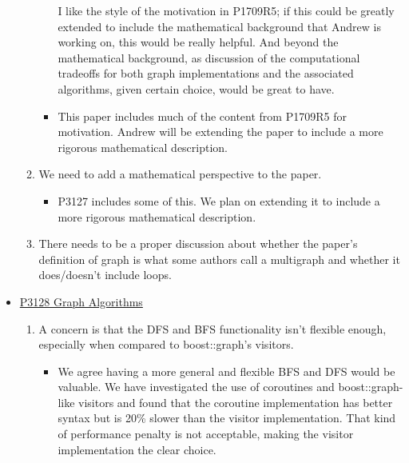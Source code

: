 \begin{itemize}
\begin{enumerate}
\begin{itemize}
                                    I like the style of the motivation in P1709R5; if this could be greatly extended to include the mathematical background that Andrew is 
                                    working on, this would be really helpful. And beyond the mathematical background, as discussion of the computational tradeoffs for 
                                    both graph implementations and the associated algorithms, given certain choice, would be great to have.
                              \item This paper includes much of the content from P1709R5 for motivation. Andrew will be extending the paper to include a more rigorous 
                                    mathematical description.
                        \end{itemize}
                  \item We need to add a mathematical perspective to the paper.
                        \begin{itemize}
                              \item P3127 includes some of this. We plan on extending it to include a more rigorous mathematical description.
                        \end{itemize}
                  \item There needs to be a proper discussion about whether the paper's definition of graph is what some authors call a multigraph 
                        and whether it does/doesn't include loops.
      \end{enumerate}
      \item \href{https://www.wg21.link/P3128}{P3128 Graph Algorithms}
            \begin{enumerate}
                  \item A concern is that the DFS and BFS functionality isn't flexible enough, especially when compared to boost::graph's visitors.
                        \begin{itemize}
                              \item We agree having a more general and flexible BFS and DFS would be valuable. We have investigated the use
                                    of coroutines and boost::graph-like visitors and found that the coroutine implementation has better
                                    syntax but is 20\% slower than the visitor implementation. That kind of performance penalty is not 
                                    acceptable, making the visitor implementation the clear choice.

\end{itemize}
\end{enumerate}
\end{itemize}
